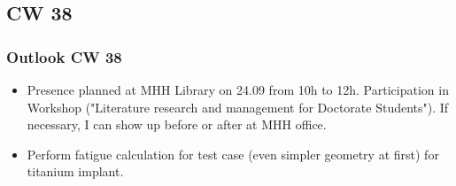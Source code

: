 \subsection{CW 38}
\begin{frame}
  \frametitle{Outlook CW 38}
	\begin{itemize}
		\item Presence planned at MHH Library on 24.09 from 10h to 12h. Participation in Workshop ("Literature research and management for Doctorate Students"). If necessary, I can show up before or after at MHH office.
		\item Perform fatigue calculation for test case (even simpler geometry at first) for titanium implant. 
	\end{itemize}
\end{frame}

